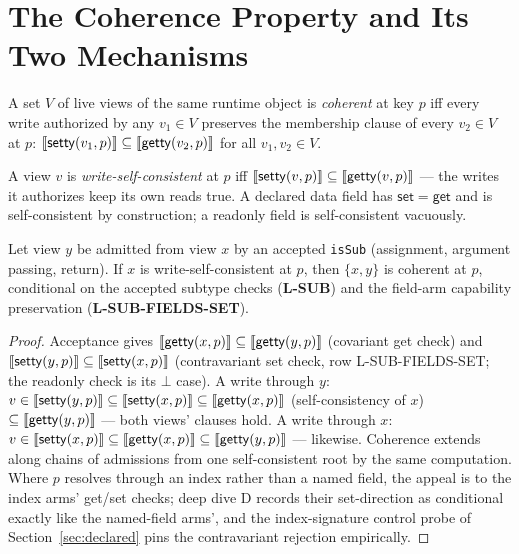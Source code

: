\documentclass[11pt]{article}
\newcommand{\setty}{\mathsf{setty}}
\newcommand{\getty}{\mathsf{getty}}
\begin{document}
\section{The Coherence Property and Its Two Mechanisms}
\label{sec:mechanisms}

\begin{definition}
\label{def:coherence}
A set $V$ of live views of the same runtime object is \emph{coherent}
at key $p$ iff every write authorized by any $v_1 \in V$ preserves the
membership clause of every $v_2 \in V$ at $p$:
$\sem{\setty(v_1,p)} \subseteq \sem{\getty(v_2,p)}$ for all
$v_1, v_2 \in V$.
\end{definition}

\begin{definition}
\label{def:selfcons}
A view $v$ is \emph{write-self-consistent} at $p$ iff
$\sem{\setty(v,p)} \subseteq \sem{\getty(v,p)}$ — the writes it
authorizes keep its own reads true. A declared data field has
$\mathsf{set} = \mathsf{get}$ and is self-consistent by construction; a
readonly field is self-consistent vacuously.
\end{definition}

\begin{lemma}
\label{lem:admission}
Let view $y$ be admitted from view $x$ by an accepted \texttt{isSub}
(assignment, argument passing, return). If $x$ is write-self-consistent
at $p$, then $\{x, y\}$ is coherent at $p$, conditional on the accepted
subtype checks (\textbf{L-SUB}) and the field-arm capability
preservation (\textbf{L-SUB-FIELDS-SET}).
\end{lemma}
\begin{proof}
Acceptance gives $\sem{\getty(x,p)} \subseteq \sem{\getty(y,p)}$
(covariant get check) and
$\sem{\setty(y,p)} \subseteq \sem{\setty(x,p)}$ (contravariant set
check, row L-SUB-FIELDS-SET; the readonly check is its $\bot$ case). A
write through $y$: $v \in \sem{\setty(y,p)} \subseteq \sem{\setty(x,p)}
\subseteq \sem{\getty(x,p)}$ (self-consistency of $x$) $\subseteq
\sem{\getty(y,p)}$ — both views' clauses hold. A write through $x$:
$v \in \sem{\setty(x,p)} \subseteq \sem{\getty(x,p)} \subseteq
\sem{\getty(y,p)}$ — likewise. Coherence extends along chains of
admissions from one self-consistent root by the same computation. Where
$p$ resolves through an index rather than a named field, the appeal is
to the index arms' get/set checks; deep dive D records their
set-direction as conditional exactly like the named-field arms', and the
index-signature control probe of Section~\ref{sec:declared} pins the
contravariant rejection empirically.
\end{proof}
\end{document}
